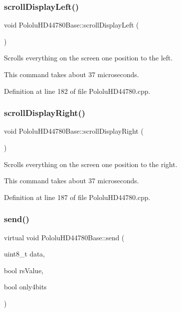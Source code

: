 \subsubsection{\texorpdfstring{scroll\+Display\+Left()}{scrollDisplayLeft()}}
{\footnotesize\ttfamily void Pololu\+H\+D44780\+Base\+::scroll\+Display\+Left (\begin{DoxyParamCaption}{ }\end{DoxyParamCaption})}

Scrolls everything on the screen one position to the left.

This command takes about 37 microseconds. 

Definition at line 182 of file Pololu\+H\+D44780.\+cpp.

\mbox{\label{class_pololu_h_d44780_base_a411512707f303af75de3c5aea313bf48}} 
\subsubsection{\texorpdfstring{scroll\+Display\+Right()}{scrollDisplayRight()}}
{\footnotesize\ttfamily void Pololu\+H\+D44780\+Base\+::scroll\+Display\+Right (\begin{DoxyParamCaption}{ }\end{DoxyParamCaption})}

Scrolls everything on the screen one position to the right.

This command takes about 37 microseconds. 

Definition at line 187 of file Pololu\+H\+D44780.\+cpp.

\mbox{\label{class_pololu_h_d44780_base_a004d5adb9e7c3cc546c6b0ed427dec7b}} 
\subsubsection{\texorpdfstring{send()}{send()}}
{\footnotesize\ttfamily virtual void Pololu\+H\+D44780\+Base\+::send (\begin{DoxyParamCaption}\item[{uint8\+\_\+t}]{data,  }\item[{bool}]{rs\+Value,  }\item[{bool}]{only4bits }\end{DoxyParamCaption})\hspace{0.3cm}{\ttfamily [pure virtual]}}

